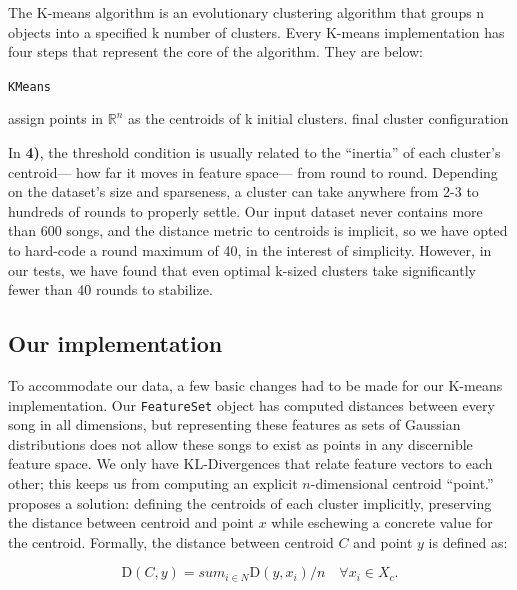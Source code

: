 \documentclass[12pt,twocolumn,titlepage]{article}
\begin{document}
The K-means algorithm is an evolutionary clustering algorithm that groups n  objects into a specified k number of clusters. Every K-means implementation has four steps that represent the core of the algorithm. They are below:

\begin{algorithm}
 \caption{\texttt{KMeans}}\label{algoCPOR}
 assign points in $\mathbb{R}^n$ as the centroids of k initial clusters.\;
 \KwRet final cluster configuration\;
\end{algorithm}

In \textbf{4)}, the threshold condition is usually related to the ``inertia'' of each cluster's centroid— how far it moves in feature space— from round to round. Depending on the dataset's size and sparseness, a cluster can take anywhere from 2-3 to hundreds of rounds to properly settle. Our input dataset never contains more than 600 songs, and the distance metric to centroids is implicit, so we have opted to hard-code a round maximum of 40, in the interest of simplicity. However, in our tests, we have found that even optimal k-sized clusters take significantly fewer than 40 rounds to stabilize. 

\subsection{Our implementation}

To accommodate our data, a few basic changes had to be made for our K-means implementation. Our \texttt{FeatureSet} object has computed distances between every song in all dimensions, but representing these features as sets of Gaussian distributions does not allow these songs to exist as points in any discernible feature space. We only have KL-Divergences that relate feature vectors to each other; this keeps us from computing an explicit $n$-dimensional centroid ``point.'' \cite{MaggbladeHongKao} proposes a solution: defining the centroids of each cluster implicitly, preserving the distance between centroid and point $x$  while eschewing a concrete value for the centroid. Formally, the distance between centroid $C$ and point $y$ is defined as:

\begin{equation}\label{}
\mathrm{D}(C, y) = sum_{i \in N}{}{\mathrm{D}(y, x_i) / n} \quad \forall x_i \in X_c.
\end{equation}
\end{document}
